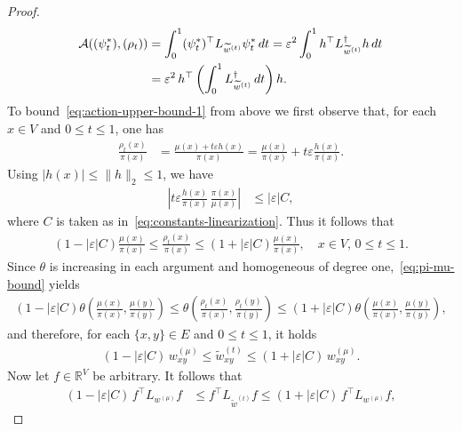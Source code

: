 \documentclass[11pt,a4paper]{article}
\begin{document}
\begin{proof}
\begin{align}
            \mathcal{A}((\psi_t^\ast), (\rho_t)) &= \int_0^{1} (\psi_t^\ast)^\top L_{\widetilde{w}^{(t)}} \psi_t^\ast \, dt = \varepsilon^2 \int_0^{1} h^\top L_{\widetilde{w}^{(t)}}^{\dagger} h \, dt\notag\\
            &= \varepsilon^2 \, h^\top \left( \int_0^{1} L_{\widetilde{w}^{(t)}}^{\dagger} \, dt \right) h.
        \end{align}
    To bound~\cref{eq:action-upper-bound-1} from above we first observe that, for each $x\in V$ and $0\le t\le 1$, one has
        \begin{align*}
            \frac{\rho_t(x)}{\pi(x)} &= \frac{\mu(x) + t \varepsilon h(x)}{\pi(x)} = \frac{\mu(x)}{\pi(x)} + t \varepsilon \frac{h(x)}{\pi(x)}.
        \end{align*}
    Using $|h(x)|\le \|h\|_2\le 1$, we have
        \begin{align*}
            \left|t \varepsilon \frac{h(x)}{\pi(x)}\,\frac{\pi(x)}{\mu(x)}\right| &\leq |\varepsilon| C,
        \end{align*}
    where $C$ is taken as in~\cref{eq:constants-linearization}. Thus it follows that
        \begin{align}\label{eq:pi-mu-bound}
            \left(1-|\varepsilon|C\right)\frac{\mu(x)}{\pi(x)} \le \frac{\rho_t(x)}{\pi(x)} \le \left(1+|\varepsilon|C\right)\frac{\mu(x)}{\pi(x)},\quad x\in V,\,0\le t\le 1.
        \end{align}
    Since $\theta$ is increasing in each argument and homogeneous of degree one,~\cref{eq:pi-mu-bound} yields
        \begin{align*}
            \left(1-|\varepsilon|C\right)\theta\left(\frac{\mu(x)}{\pi(x)},\frac{\mu(y)}{\pi(y)}\right)
            \le \theta\left(\frac{\rho_t(x)}{\pi(x)},\frac{\rho_t(y)}{\pi(y)}\right)
            \le \left(1+|\varepsilon|C\right)\theta\left(\frac{\mu(x)}{\pi(x)},\frac{\mu(y)}{\pi(y)}\right),
        \end{align*}
    and therefore, for each $\{x, y\}\in E$ and $0\le t\le 1$, it holds
        \begin{align*}
            (1 - |\varepsilon| C) \, w^{(\mu)}_{xy} \leq \widetilde{w}^{(t)}_{xy} \leq (1 + |\varepsilon| C) \, w^{(\mu)}_{xy}.
        \end{align*}
    Now let $f\in\mathbb{R}^{V}$ be arbitrary. It follows that
        \begin{align*}
            (1 - |\varepsilon| C) \, f^\top L_{w^{(\mu)}} f &\leq f^\top L_{\widetilde{w}^{(t)}} f \leq (1 + |\varepsilon| C) \, f^\top L_{w^{(\mu)}} f,

\end{align*}
\end{proof}
\end{document}
